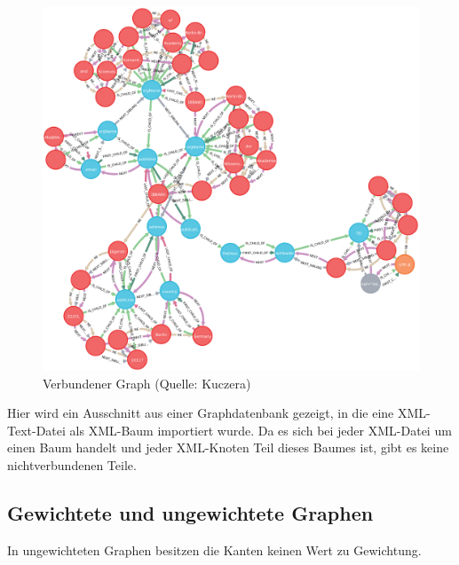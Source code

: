 \documentclass[ngerman,]{scrreprt}
\begin{document}
\begin{figure}
\centering
\includegraphics{Bilder/connectedGraph.png}
\caption{Verbundener Graph (Quelle: Kuczera)}
\end{figure}

Hier wird ein Ausschnitt aus einer Graphdatenbank gezeigt, in die eine XML-Text-Datei als XML-Baum importiert wurde. Da es sich bei jeder XML-Datei um einen Baum handelt und jeder XML-Knoten Teil dieses Baumes ist, gibt es keine nichtverbundenen Teile.

\hypertarget{gewichtete-und-ungewichtete-graphen}{%
\subsection{Gewichtete und ungewichtete Graphen}\label{gewichtete-und-ungewichtete-graphen}}

In ungewichteten Graphen besitzen die Kanten keinen Wert zu Gewichtung.
\end{document}
